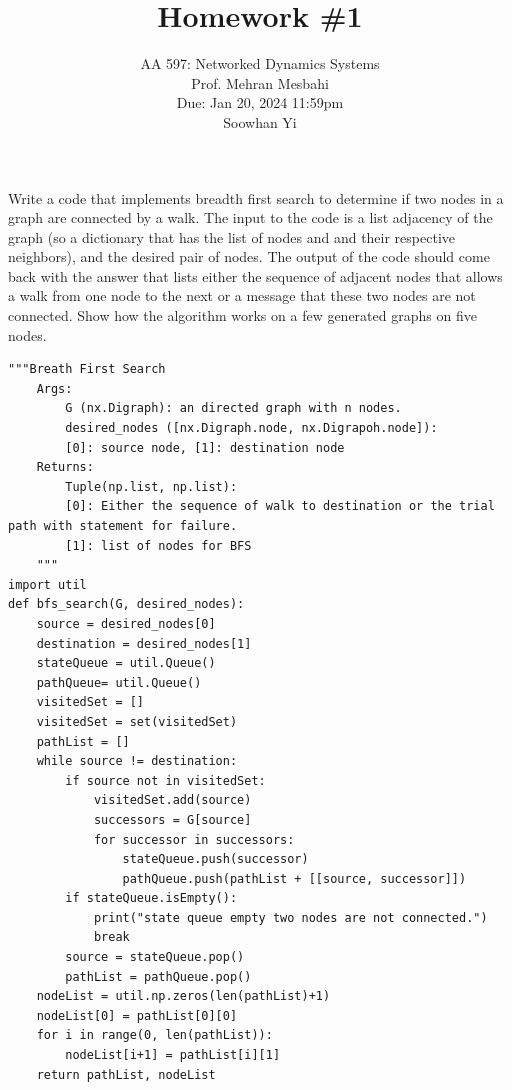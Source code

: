 \documentclass{article}
\begin{document}
\setcounter{problem}{0}
\title{Homework \#1}
\author{
    \normalsize{AA 597: Networked Dynamics Systems}\\
    \normalsize{Prof. Mehran Mesbahi}\\
    \normalsize{Due: Jan 20, 2024 11:59pm}\\
    \normalsize{Soowhan Yi}
}
\date{{}}
\maketitle

\begin{problem}
    Write a code that implements breadth first search to determine if two nodes in a graph are connected by a walk. The input to the code is a list adjacency of the graph (so a dictionary that has the list of nodes and and their respective neighbors), and the desired pair of nodes. The output of the code should come back with the answer that lists either the sequence of adjacent nodes that allows a walk from one node to the next or a message that these two nodes are not connected.  Show how the algorithm works on a few generated graphs on five nodes.
\begin{verbatim}
"""Breath First Search
    Args:
        G (nx.Digraph): an directed graph with n nodes. 
        desired_nodes ([nx.Digraph.node, nx.Digrapoh.node]):  
        [0]: source node, [1]: destination node
    Returns:
        Tuple(np.list, np.list):
        [0]: Either the sequence of walk to destination or the trial path with statement for failure. 
        [1]: list of nodes for BFS
    """
import util
def bfs_search(G, desired_nodes):
    source = desired_nodes[0]
    destination = desired_nodes[1]
    stateQueue = util.Queue()
    pathQueue= util.Queue()
    visitedSet = []
    visitedSet = set(visitedSet)
    pathList = []
    while source != destination:
        if source not in visitedSet:       
            visitedSet.add(source)
            successors = G[source]
            for successor in successors:
                stateQueue.push(successor)
                pathQueue.push(pathList + [[source, successor]])
        if stateQueue.isEmpty(): 
            print("state queue empty two nodes are not connected.")
            break
        source = stateQueue.pop()
        pathList = pathQueue.pop()
    nodeList = util.np.zeros(len(pathList)+1)
    nodeList[0] = pathList[0][0]
    for i in range(0, len(pathList)):
        nodeList[i+1] = pathList[i][1]
    return pathList, nodeList    
\end{verbatim}

\end{problem}
\end{document}
